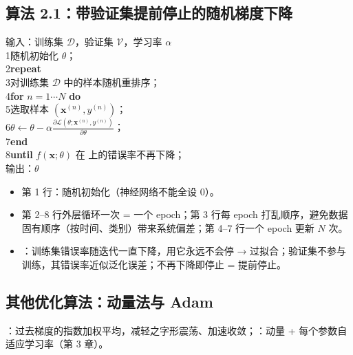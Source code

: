 \subsection{算法 2.1：带验证集提前停止的随机梯度下降}
\noindent\begin{minipage}[t]{0.5\linewidth}\vspace{0pt}
\begin{method}[算法 2.1：随机梯度下降法]
\small 输入：训练集 $\mathcal D$，验证集 $\mathcal V$，学习率 $\alpha$\\
1\quad 随机初始化 $\theta$；\\
2\quad \textbf{repeat}\\
3\quad\quad 对训练集 $\mathcal D$ 中的样本随机重排序；\\
4\quad\quad \textbf{for} $n=1\cdots N$ \textbf{do}\\
5\quad\quad\quad 选取样本 $(\bm x^{(n)},y^{(n)})$；\\
6\quad\quad\quad $\theta\leftarrow\theta-\alpha\frac{\partial\mathcal L(\theta;\bm x^{(n)},y^{(n)})}{\partial\theta}$；\\
7\quad\quad \textbf{end}\\
8\quad \textbf{until} $f(\bm x;\theta)$ 在 上的错误率不再下降；\\
输出：$\theta$
\end{method}
\end{minipage}\hfill
\begin{minipage}[t]{0.47\linewidth}\vspace{2pt}\small
\begin{itemize}
\item 第 1 行：随机初始化（神经网络不能全设 0）。
\item 第 2–8 行外层循环一次 = 一个 epoch；第 3 行每 epoch 打乱顺序，避免数据固有顺序（按时间、类别）带来系统偏差；第 4–7 行一个 epoch 更新 $N$ 次。
\item {}：训练集错误率随迭代一直下降，用它永远不会停 → 过拟合；验证集不参与训练，其错误率近似泛化误差；不再下降即停止 = 提前停止。
\end{itemize}
\end{minipage}

\subsection{其他优化算法：动量法与 Adam}
：过去梯度的指数加权平均，减轻之字形震荡、加速收敛；：动量 + 每个参数自适应学习率（第 3 章）。

